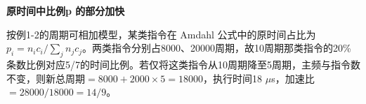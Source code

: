 {\color{ink}\bfseries 原时间中比例p 的部分加快}\par\vspace{1bp}按例1-2的周期可相加模型，某类指令在 Amdahl 公式中的原时间占比为\(p_{i}=\allowbreak{}n_{i}c_{i}/\allowbreak{}\sum _{j}n_{j}c_{j}\)。两类指令分别占8000、20000周期，故10周期那类指令的20\%条数比例对应5/\allowbreak{}7的时间比例。若仅将这类指令从10周期降至5周期，主频与指令数不变，则新总周期\(=\allowbreak{}8000+\allowbreak{}2000\times 5=\allowbreak{}18000\)，执行时间18 \(\mu \)s，加速比\(=\allowbreak{}28000/\allowbreak{}18000=\allowbreak{}14/\allowbreak{}9\)。

